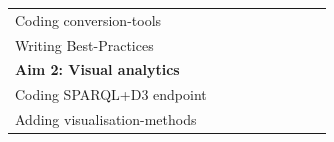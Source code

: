 \documentclass[twoside,fontsize=10pt]{article}
\begin{document}
\begin{table}[h]
\begin{center}
\begin{tabular}{lllllllll}
\hspace*{1em} Coding conversion-tools           &                                                 & \cellcolor[HTML]{656565}                        & \cellcolor[HTML]{656565}                        &                                                 &                                                 &                                                 &                                                 &                                                 \\
\hspace*{1em} Writing Best-Practices            &                                                 &                                                 & \cellcolor[HTML]{656565}                        &                                                 &                                                 &                                                 &                                                 &                                                 \\
\textbf{Aim 2: Visual analytics}                &                                                 &                                                 & \cellcolor[HTML]{343434}                        & \cellcolor[HTML]{343434}                        &                                                 &                                                 &                                                 &                                                 \\
\hspace*{1em} Coding SPARQL+D3 endpoint         &                                                 &                                                 & \cellcolor[HTML]{656565}                        &                                                 &                                                 &                                                 &                                                 &                                                 \\
\hspace*{1em} Adding visualisation-methods      &                                                 &                                                 & \cellcolor[HTML]{656565}                        & \cellcolor[HTML]{656565}                        &                                                 &                                                 &                                                 &                                                 \\

\end{tabular}
\end{center}
\end{table}
\end{document}
